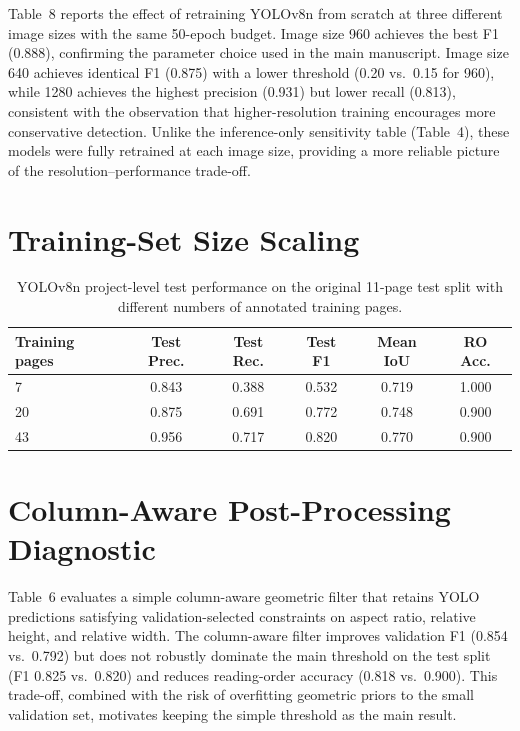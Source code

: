 \documentclass[pdflatex,sn-mathphys-num]{sn-jnl}
\begin{document}
Table~8 reports the effect of retraining YOLOv8n from scratch at three different image sizes with the same 50-epoch budget. Image size 960 achieves the best F1 (0.888), confirming the parameter choice used in the main manuscript. Image size 640 achieves identical F1 (0.875) with a lower threshold (0.20 vs.\ 0.15 for 960), while 1280 achieves the highest precision (0.931) but lower recall (0.813), consistent with the observation that higher-resolution training encourages more conservative detection. Unlike the inference-only sensitivity table (Table~4), these models were fully retrained at each image size, providing a more reliable picture of the resolution--performance trade-off.

\section{Training-Set Size Scaling}

\begin{table}[t]
\centering
\scriptsize\setlength{\tabcolsep}{3pt}
\caption{YOLOv8n project-level test performance on the original 11-page test split with different numbers of annotated training pages.}
\begin{tabular}{lccccc}
\toprule
Training pages & Test Prec. & Test Rec. & Test F1 & Mean IoU & RO Acc. \\
\midrule
7 & 0.843 & 0.388 & 0.532 & 0.719 & 1.000 \\
20 & 0.875 & 0.691 & 0.772 & 0.748 & 0.900 \\
43 & 0.956 & 0.717 & 0.820 & 0.770 & 0.900 \\
\bottomrule
\end{tabular}
\end{table}

\section{Column-Aware Post-Processing Diagnostic}

Table~6 evaluates a simple column-aware geometric filter that retains YOLO predictions satisfying validation-selected constraints on aspect ratio, relative height, and relative width. The column-aware filter improves validation F1 (0.854 vs.\ 0.792) but does not robustly dominate the main threshold on the test split (F1 0.825 vs.\ 0.820) and reduces reading-order accuracy (0.818 vs.\ 0.900). This trade-off, combined with the risk of overfitting geometric priors to the small validation set, motivates keeping the simple threshold as the main result.
\end{document}

